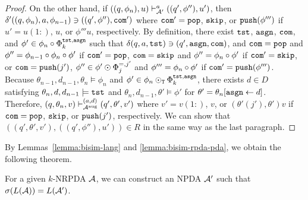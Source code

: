 \begin{proof}
On the other hand,
if $((q,\phi_n),u)\vdash_{{\cal A}'}^a ((q',\phi''),u')$, then
$\delta'((q,\phi_n),a,\allowbreak
\phi_{n-1})\ni ((q',\phi''),\mathtt{com}')$
where
$\mathtt{com}'=\mathtt{pop}$, $\mathtt{skip}$, or $\mathtt{push}(\phi''')$ if
$u'=u(1{:})$, $u$, or $\phi'''u$, respectively.
By definition,
there exist $\mathtt{tst}$, $\mathtt{asgn}$, $\mathtt{com}$, and
$\phi'\in\phi_n\circ\Phi_k^{\mathtt{tst},\mathtt{asgn}}$ such that
$\delta(q,a,\mathtt{tst})\ni(q',\mathtt{asgn},\mathtt{com})$, and
$\mathtt{com}=\mathtt{pop}$ and $\phi''=\phi_{n-1}\circ\phi_n\circ\phi'$
if $\mathtt{com}'=\mathtt{pop}$,
$\mathtt{com}=\mathtt{skip}$ and $\phi''=\phi_n\circ\phi'$ if $\mathtt{com}'=\mathtt{skip}$,
or
$\mathtt{com}=\mathtt{push}(j')$, $\phi''\in\phi'\odot\Phi_j^{=,j'}$
and $\phi'''=\phi_n\circ\phi'$ if $\mathtt{com}'=\mathtt{push}(\phi''')$.
Because $\theta_{n-1},d_{n-1},\theta_n\models\phi_n$ and
$\phi'\in\phi_n\odot_{\mathtt{T}}\Phi_k^{\mathtt{tst},\mathtt{asgn}}$,
there exists $d\in D$ satisfying
$\theta_n,d,d_{n-1}\models\mathtt{tst}$ and
$\theta_n,d_{n-1},\theta'\models\phi'$
for $\theta'=\theta_n[\mathtt{asgn}\gets d]$.
Therefore,
$(q,\theta_n,v)\vdash_{{\cal A}^{\mathrm{aug}}}^{(a,d)} (q',\theta',v')$
where
$v'=v(1{:})$, $v$, or
$(\theta'(j'),\theta')v$
if $\mathtt{com}=\mathtt{pop}$, $\mathtt{skip}$, or $\mathtt{push}(j')$, respectively.
We can show that $((q',\theta',v'),((q',\phi''),u'))\in R$
in the same way as the last paragraph.
\end{proof}

By Lemmas~\ref{lemma:bisim-lang} and \ref{lemma:bisim-rpda-pda},
we obtain the following theorem.
\begin{theorem}
\label{the: RPDAtoPDA}
For a given $k$-NRPDA ${\cal A}$, we can construct an NPDA ${\cal A}'$
such that $\sigma(L({\cal A}))=L({\cal A}')$.
\end{theorem}
